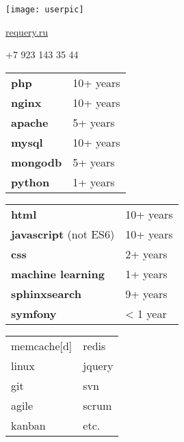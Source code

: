 \documentclass[paper=a4,fontsize=11pt]{eucv}
\begin{document}
\begin{minipage}{.2\linewidth}
   \texttt{[image: userpic]}
\end{minipage}      
\begin{minipage}{0.7\linewidth}
   \sepspace
   \noindent
   
   \hfill {}%
   
   \hfill \href{http://requery.ru}{requery.ru}%
   
   \hfill +7 923 143 35 44%
   
   \hfill {}%
\end{minipage}


\hspace{3mm}
\begin{minipage}[t]{0.33\textwidth} 
	
	\begin{tabular}[t]{ l l }
		\textbf{php} & 10+ years \\
		\textbf{nginx} & 10+ years \\
		\textbf{apache} & 5+ years \\
		\textbf{mysql} & 10+ years \\
		\textbf{mongodb} & 5+ years \\
		\textbf{python} & 1+ years \\
	\end{tabular}
	
	\sepspace
	
\end{minipage}
%
\begin{minipage}[t]{0.33\textwidth} 
	
	\begin{tabular}[t]{ l l }
		\textbf{html} & 10+ years \\
		\textbf{javascript} (not ES6) & 10+ years \\
		\textbf{css} & 2+ years \\
		\textbf{machine learning} & 1+ years \\
		\textbf{sphinxsearch} & 9+ years \\
		\textbf{symfony} & < 1 year
	\end{tabular}
	
	\sepspace
	
\end{minipage}
%
\begin{minipage}[t]{0.33\textwidth} 
	\begin{tabular}[t]{l l}
		memcache[d] & redis \\
		linux & jquery  \\
		git & svn \\
		agile & scrum  \\
		kanban & etc. \\
	\end{tabular}
\end{minipage}
\end{document}
